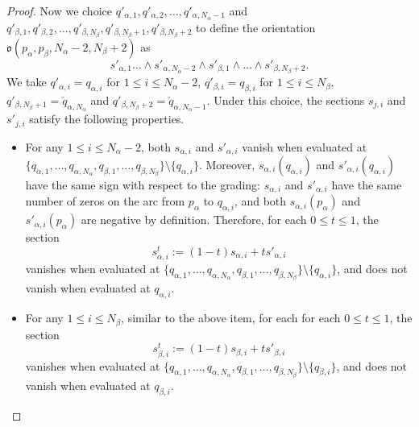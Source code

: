 \documentclass[11pt,a4paper]{article}
\theoremstyle{definition}
\theoremstyle{remark}
\numberwithin{equation}{section}
\begin{document}
\begin{proof}
    Now we choice $q'_{\alpha,1},q'_{\alpha,2},\dots,q'_{\alpha,{N_\alpha-1}}$ and $q'_{\beta,1},q'_{\beta,2},\dots,q'_{\beta,{N_\beta}},q'_{\beta,{N_\beta+1}},q'_{\beta,{N_\beta+2}}$ to define the orientation $\mathfrak o(p_\alpha,p_\beta,N_\alpha-2,N_\beta+2)$ as 
    $$
    s'_{\alpha,1}\dots \wedge s'_{\alpha,N_\alpha-2}\wedge s'_{\beta,1}\wedge \dots \wedge s'_{\beta,N_\beta+2}.
    $$
    We take $q'_{\alpha,i}=q_{\alpha,i}$ for $1\le i \le N_\alpha-2$, $q'_{\beta,i}=q_{\beta,i}$ for $1\le i \le N_\beta$,  $q'_{\beta,N_\beta+1}=\check{q}_{\alpha,N_\alpha}$ and $q'_{\beta,N_\beta+2}=\check{q}_{\alpha,N_\alpha-1}$. 
    Under this choice, the sections $s_{j,i}$ and $s'_{j,i}$ satisfy the following properties.
    \begin{itemize}
        \item For any $1\le i \le N_\alpha-2$, both $s_{\alpha,i}$ and $s'_{\alpha,i}$ vanish when evaluated at $\{q_{\alpha,1},\dots,q_{\alpha,N_\alpha},q_{\beta,1},\dots,q_{\beta,N_\beta}\}\setminus\{q_{\alpha,i}\}$. Moreover, $s_{\alpha,i}(q_{\alpha,i})$ and $s'_{\alpha,i}(q_{\alpha,i})$ have the same sign with respect to the grading: $s_{\alpha,i}$ and $s'_{\alpha,i}$ have the same number of zeros on the arc from $p_\alpha$ to $q_{\alpha,i}$, and both $s_{\alpha,i}(p_\alpha)$ and $s'_{\alpha,i}(p_\alpha)$ are negative by definition. Therefore, for each $0\le t \le 1$, the section
        $$
        s^t_{\alpha,i}:=(1-t)s_{\alpha,i}+ts'_{\alpha,i}
        $$
        vanishes when evaluated at $\{q_{\alpha,1},\dots,q_{\alpha,N_\alpha},q_{\beta,1},\dots,q_{\beta,N_\beta}\}\setminus\{q_{\alpha,i}\}$, and does not vanish when  evaluated at $q_{\alpha,i}$.
        
        \item For any $1\le i \le N_\beta$, similar to the above item, for each for each $0\le t \le 1$, the section
        $$
        s^t_{\beta,i}:=(1-t)s_{\beta,i}+ts'_{\beta,i}
        $$
        vanishes when evaluated at $\{q_{\alpha,1},\dots,q_{\alpha,N_\alpha},q_{\beta,1},\dots,q_{\beta,N_\beta}\}\setminus\{q_{\beta,i}\}$, and does not vanish when  evaluated at $q_{\beta,i}$.
        

\end{itemize}
\end{proof}
\end{document}

